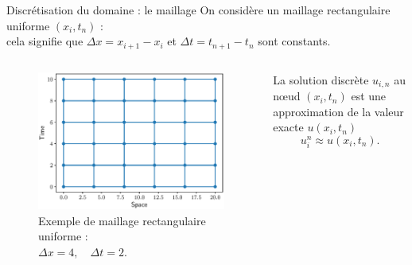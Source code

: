 \documentclass[aspectratio=169, french]{beamer}
\begin{document}
\begin{frame}{Discrétisation du domaine : le maillage}
On considère un maillage rectangulaire uniforme $(x_i, t_n)$ : \\
cela signifie que $\Delta x = x_{i+1}- x_i $ et $\Delta t = t_{n+1}- t_n$ sont constants. \\
  

	\begin{columns}
	\begin{column}{.5\textwidth}
	\begin{figure}
		\includegraphics[height=.5\textheight]{mesh.eps}
		\caption*{Exemple de maillage rectangulaire uniforme :\\ $\Delta x = 4, \quad \Delta t=2$.}
	\end{figure}	
	\end{column}
	\begin{column}{.5\textwidth}
		\begin{tcolorbox}
			La solution discrète $u_{i, n}$ au n\oe{}ud $(x_i, t_n)$ est une approximation  de la valeur exacte $u(x_i, t_n)$
			\begin{equation*}
				u_{i}^n \approx u(x_i, t_n).
			\end{equation*} 
		\end{tcolorbox}
	
	\end{column}
\end{columns}	

\end{frame}
\end{document}
